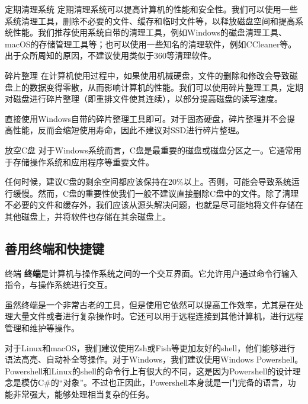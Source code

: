 \documentclass{beamer}
\begin{document}
\begin{frame}{定期清理系统}
    定期清理系统可以提高计算机的性能和安全性。我们可以使用一些系统清理工具，删除不必要的文件、缓存和临时文件等，以释放磁盘空间和提高系统性能。我们推荐使用系统自带的清理工具，例如Windows的磁盘清理工具、macOS的存储管理工具等；也可以使用一些知名的清理软件，例如CCleaner等。出于众所周知的原因，不建议使用类似于360等清理软件。
\end{frame}

\begin{frame}{碎片整理}
    在计算机使用过程中，如果使用机械硬盘，文件的删除和修改会导致磁盘上的数据变得零散，从而影响计算机的性能。我们可以使用碎片整理工具，定期对磁盘进行碎片整理（即重排文件使其连续），以部分提高磁盘的读写速度。

    直接使用Windows自带的碎片整理工具即可。对于固态硬盘，碎片整理并不会提高性能，反而会缩短使用寿命，因此不建议对SSD进行碎片整理。
\end{frame}

\begin{frame}{放空C盘}
    对于Windows系统而言，C盘是最重要的磁盘或磁盘分区之一。它通常用于存储操作系统和应用程序等重要文件。

    任何时候，建议C盘的剩余空间都应该保持在20\%以上。否则，可能会导致系统运行缓慢。然而，C盘的重要性使我们一般不建议直接删除C盘中的文件。除了清理不必要的文件和缓存外，我们应该从源头解决问题，也就是尽可能地将文件存储在其他磁盘上，并将软件也存储在其余磁盘上。
\end{frame}
\subsection{善用终端和快捷键}

\begin{frame}{终端}
    \textbf{终端}是计算机与操作系统之间的一个交互界面。它允许用户通过命令行输入指令，与操作系统进行交互。

    虽然终端是一个非常古老的工具，但是使用它依然可以提高工作效率，尤其是在处理大量文件或者进行复杂操作时。它还可以用于远程连接到其他计算机，进行远程管理和维护等操作。

    对于Linux和macOS，我们建议使用Zsh或Fish等更加友好的shell，他们能够进行语法高亮、自动补全等操作。对于Windows，我们建议使用Windows Powershell。Powershell和Linux的shell的命令行上有很大的不同，这是因为Powershell的设计理念是模仿C\#的“对象”。不过也正因此，Powershell本身就是一门完备的语言，功能非常强大，能够处理相当复杂的任务。
    
\end{frame}
\end{document}
